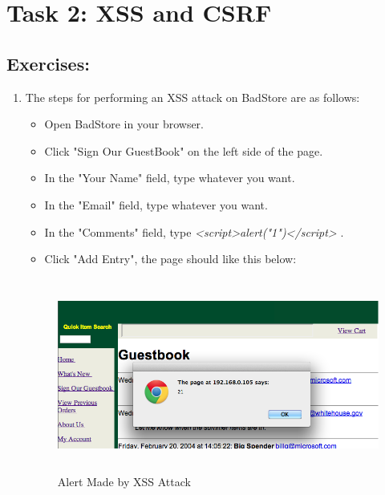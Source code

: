 \section*{Task 2: XSS and CSRF}
\subsection*{Exercises:}
\begin{enumerate}
\item The steps for performing an XSS attack on BadStore are as follows:
  \begin{itemize}
  \item Open BadStore in your browser.
  \item Click "Sign Our GuestBook" on the left side of the page.
  \item In the "Your Name" field, type whatever you want.
  \item In the "Email" field, type whatever you want.
  \item In the "Comments" field, type \textit{<script>alert("1")</script>} .
  \item Click "Add Entry", the page should like this below:
  \end{itemize}
  \begin{figure}[h!]
    \caption{Alert Made by XSS Attack}
    \begin{center}\includegraphics[height=2.5in]{xss}
    \end{center}
  \end{figure}


\end{enumerate}
